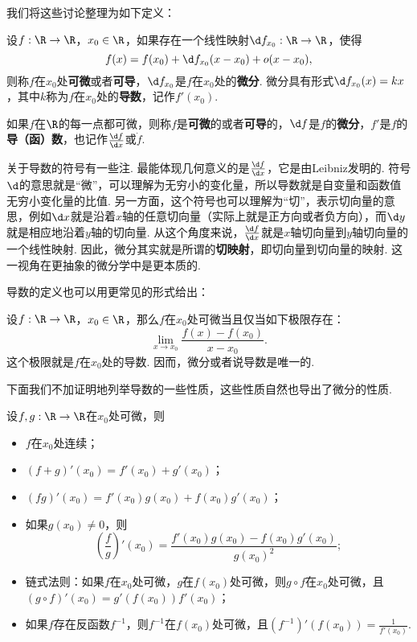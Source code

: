我们将这些讨论整理为如下定义：

\begin{definition}[微分，导数]
    设$f:\R\to\R$，$x_0\in\R$，如果存在一个线性映射$\d f_{x_0}:\R\to\R$，使得
    \[
        f(x)=f(x_0)+\d f_{x_0}(x-x_0)+o(x-x_0),
    \]
    则称$f$在$x_0$处\textbf{可微}或者\textbf{可导}，$\d f_{x_0}$是$f$在$x_0$处的\textbf{微分}. 微分具有形式$\d f_{x_0}(x)=kx$，其中$k$称为$f$在$x_0$处的\textbf{导数}，记作$f'(x_0)$.

    如果$f$在$\R$的每一点都可微，则称$f$是\textbf{可微}的或者\textbf{可导}的，$\d f$是$f$的\textbf{微分}，$f'$是$f$的\textbf{导（函）数}，也记作$\frac{\d f}{\d x}$或$\dot{f}$.
\end{definition}

关于导数的符号有一些注. 最能体现几何意义的是$\frac{\d f}{\d x}$，它是由Leibniz发明的. 符号$\d$的意思就是“微”，可以理解为无穷小的变化量，所以导数就是自变量和函数值无穷小变化量的比值. 另一方面，这个符号也可以理解为“切”，表示切向量的意思，例如$\d x$就是沿着$x$轴的任意切向量（实际上就是正方向或者负方向），而$\d y$就是相应地沿着$y$轴的切向量. 从这个角度来说，$\frac{\d f}{\d x}$就是$x$轴切向量到$y$轴切向量的一个线性映射. 因此，微分其实就是所谓的\textbf{切映射}，即切向量到切向量的映射. 这一视角在更抽象的微分学中是更本质的. 

导数的定义也可以用更常见的形式给出：

\begin{proposition}\label{prop:derivative}
    设$f:\R\to\R$，$x_0\in\R$，那么$f$在$x_0$处可微当且仅当如下极限存在：
    \[
        \lim_{x\to x_0}\frac{f(x)-f(x_0)}{x-x_0}.
    \]
    这个极限就是$f$在$x_0$处的导数. 因而，微分或者说导数是唯一的. 
\end{proposition}

下面我们不加证明地列举导数的一些性质，这些性质自然也导出了微分的性质. 

\begin{proposition}\label{prop:uni-derivative-property}
    设$f,g:\R\to\R$在$x_0$处可微，则
    \begin{itemize}
        \item $f$在$x_0$处连续；
        \item $(f+g)'(x_0)=f'(x_0)+g'(x_0)$；
        \item $(fg)'(x_0)=f'(x_0)g(x_0)+f(x_0)g'(x_0)$；
        \item 如果$g(x_0)\neq 0$，则
        \[\left(\frac{f}{g}\right)'(x_0)=\frac{f'(x_0)g(x_0)-f(x_0)g'(x_0)}{g(x_0)^2};\]
        \item 链式法则：如果$f$在$x_0$处可微，$g$在$f(x_0)$处可微，则$g\circ f$在$x_0$处可微，且$(g\circ f)'(x_0)=g'(f(x_0))f'(x_0)$；
        \item 如果$f$存在反函数$f^{-1}$，则$f^{-1}$在$f(x_0)$处可微，且$(f^{-1})'(f(x_0))=\frac{1}{f'(x_0)}$.
    \end{itemize}
\end{proposition}

